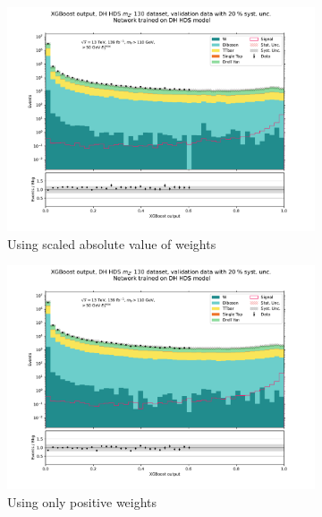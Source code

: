\documentclass[12pt, a4paper]{book}
\begin{document}
\begin{figure}[!ht]
	\centering
	\begin{subfigure}[b]{0.49\textwidth}
      \centering
      \includegraphics[width=1\textwidth]{Abs_wgt/VAL.pdf}
      \caption{Using scaled absolute value of weights}
   \end{subfigure}
   \begin{subfigure}[b]{0.49\textwidth}
      \centering
      \includegraphics[width=1\textwidth]{Pos_wgt/VAL.pdf}
      \caption{Using only positive weights}
   \end{subfigure}
   \begin{subfigure}[b]{0.49\textwidth}
      \centering

\end{subfigure}
\end{figure}
\end{document}
